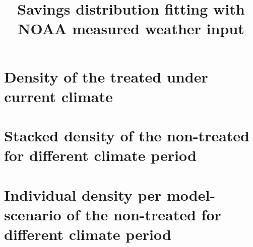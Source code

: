 \documentclass[12pt]{article}
\begin{document}
\title{Savings distribution fitting with NOAA measured weather input}
\maketitle
\tableofcontents
\newpage
\section{Density of the treated under current climate}

\section{Stacked density of the non-treated for different climate period}

\section{Individual density per model-scenario of the non-treated for different climate period}

% 
% 
\end{document}

